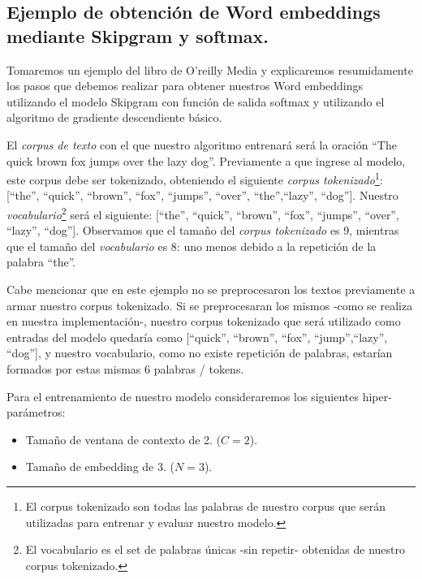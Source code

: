 \documentclass[12pt,a4paper]{article}
\begin{document}
\begin{sloppypar}

\cleardoublepage

\subsection{Ejemplo de obtención de Word embeddings mediante Skipgram y softmax.}\label{anexo_word_emb}

Tomaremos un ejemplo del libro de O’reilly Media\cite{NLP_26} y explicaremos resumidamente los pasos que debemos realizar para obtener nuestros Word embeddings utilizando el modelo Skipgram con función de salida softmax y utilizando el algoritmo de gradiente descendiente básico.

El \textit{corpus de texto} con el que nuestro algoritmo entrenará será la oración “The quick brown fox jumps over the lazy dog”. Previamente a que ingrese al modelo, este corpus debe ser tokenizado, obteniendo el siguiente \textit{corpus tokenizado}\footnote{El corpus tokenizado son todas las palabras de nuestro corpus que serán utilizadas para entrenar y evaluar nuestro modelo.}: [“the”, “quick”, “brown”, “fox”, “jumps”, “over”, “the”,“lazy”, “dog”]. Nuestro \textit{vocabulario}\footnote{El vocabulario es el set de palabras únicas -sin repetir- obtenidas de nuestro corpus tokenizado.} será el siguiente: [“the”, “quick”, “brown”, “fox”, “jumps”, “over”, “lazy”, “dog”]. Observamos que el tamaño del \textit{corpus tokenizado} es 9, mientras que el tamaño del \textit{vocabulario} es 8: uno menos debido a la repetición de la palabra “the”. 

Cabe mencionar que en este ejemplo no se preprocesaron los textos previamente a armar nuestro corpus tokenizado. Si se preprocesaran los mismos -como se realiza en nuestra implementación-, nuestro corpus tokenizado que será utilizado como entradas del modelo quedaría como [“quick”, “brown”, “fox”, “jump”,“lazy”, “dog”], y nuestro vocabulario, como no existe repetición de palabras, estarían formados por estas mismas 6 palabras / tokens.

Para el entrenamiento de nuestro modelo consideraremos los siguientes hiper-parámetros:
\begin{itemize}
\item Tamaño de ventana de contexto de 2. ($C=2$).
\item Tamaño de embedding de 3. ($N=3$).
\end{itemize}


\end{sloppypar}
\end{document}
